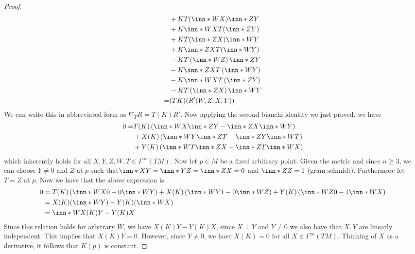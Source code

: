 \documentclass[a4paper]{article}
\begin{document}
\begin{proof}
\[\begin{aligned}
                                              &+ KT(\inn*{W}{X})\inn*{Z}{Y} \\
                                              &+ K\inn*{W}{X}T(\inn*{Z}{Y}) \\
                                              &+ KT(\inn*{Z}{X})\inn*{W}{Y} \\
                                              &+ K\inn*{Z}{X}T(\inn*{W}{Y}) \\ 
                                              &- KT \left( \inn*{W}{Z} \right)\inn*{Z}{Y} \\
                                              &- K\inn*{Z}{X} T \left( \inn*{W}{Y} \right) \\
                                              &- K\inn*{W}{X} T \left( \inn*{Z}{Y} \right) \\
                                              &- KT \left( \inn*{Z}{X} \right) \inn*{W}{Y}\\
      =& (TK)(R'(W,Z,X,Y))
    \end{aligned}
  \]
  We can write this in abbreviated form as $\nabla_T R = T(K)R'$. Now applying the second bianchi identity we just proved, we have
  \[
    \begin{aligned}
      0 =& T(K) \left( \inn*{W}{X}\inn*{Z}{Y} - \inn*{Z}{X}\inn*{W}{Y} \right) \\
         &+ X(K) \left( \inn*{W}{Y}\inn*{Z}{T} - \inn*{Z}{Y}\inn*{W}{T} \right) \\
         &+ Y(K) \left( \inn*{W}{T}\inn*{Z}{X} - \inn*{Z}{T}\inn*{W}{X} \right) \\
    \end{aligned}
  \]
  which inherently holds for all $X,Y,Z,W,T \in \Gamma^\infty (TM)$. Now let $p \in M$ be a fixed arbitrary point. Given the metric and since $n \geq 3$, we can choose $Y \neq 0$ and $Z$ at $p$ such that$ \inn*{X}{Y} = \inn*{Y}{Z} = \inn*{Z}{X} = 0$  and  $\inn*{Z}{Z} = 1$ (gram schmidt). Furthermore let $T = Z$ at $p$. Now we have that the above expression is
  \[
    \begin{aligned}
      0 &= T(K)\left( \inn*{W}{X}0 - 0\inn*{W}{Y} \right) + X(K) \left(\inn*{W}{Y}1 - 0\inn*{W}{Z} \right) + Y(K)\left(\inn*{W}{Z}0 - 1\inn*{W}{X} \right) \\
        &= X(K) (\inn*{W}{Y}) - Y(K)(\inn*{W}{X}) \\
        &= \inn*{W}{X(K)Y - Y(K)X}
    \end{aligned}
  \]
  Since this relation holds for arbitrary $W$, we have $X(K)Y - Y(K)X$, since $X \perp Y$ and $Y \neq 0$ we also have that $X,Y$ are linearly independent. This implies that $X(K)Y = 0$. However, since $Y \neq 0$, we have $X(K) = 0$ for all $X \in \Gamma^{\infty}(TM)$. Thinking of $X$ as a derivative, it follows that $K(p) $ is constant.
\end{proof}
\end{document}
